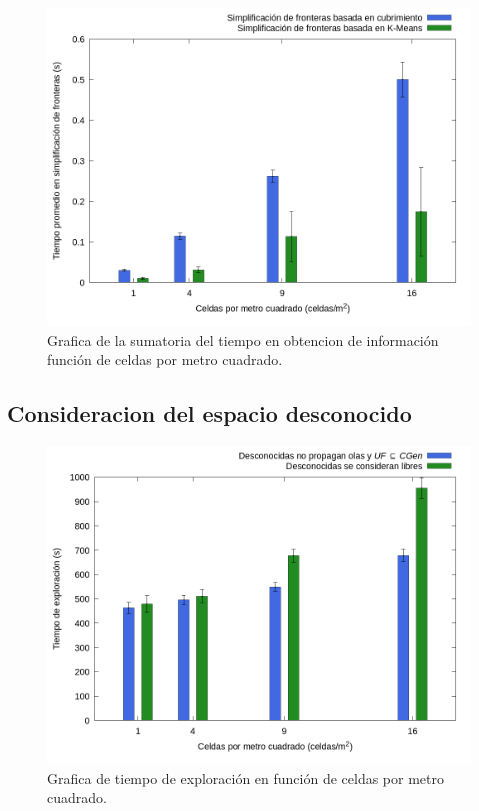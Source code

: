 \begin{figure}[H]
  \centerfloat

  \includegraphics[clip=true, width=\graphlen]{imagenes/graficas_chicas/graficas_histo_num/ident_obj/obj_id_time_mean.png}

  \caption{Grafica de la sumatoria del tiempo en obtencion de información función de celdas por metro cuadrado.}\label{fig:gra:idobj:iobt}

\end{figure}

\subsection{Consideracion del espacio desconocido}\label{sec:exp:desco}



\begin{figure}[H]
  \centerfloat

  \includegraphics[clip=true, width=\graphlen]{imagenes/graficas_chicas/graficas_histo_num/desconocido/exploration_time.png}

  \caption{Grafica de tiempo de exploración en función de celdas por metro cuadrado.}\label{fig:gra:des:et}

\end{figure}

